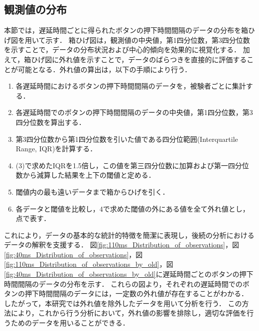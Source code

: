 \subsection{観測値の分布}
本節では，遅延時間ごとに得られたボタンの押下時間間隔のデータの分布を箱ひげ図を用いて示す．
箱ひげ図は，観測値の中央値，第1四分位数，第3四分位数を示すことで，データの分布状況および中心的傾向を効果的に視覚化する．
加えて，箱ひげ図に外れ値を示すことで，データのばらつきを直接的に評価することが可能となる．外れ値の算出は，以下の手順により行う．
\begin{enumerate}
  \item 各遅延時間におけるボタンの押下時間間隔のデータを，被験者ごとに集計する．
  \item 各遅延時間でのボタンの押下時間間隔のデータの中央値，第1四分位数，第3四分位数を算出する．
  \item 第3四分位数から第1四分位数を引いた値である四分位範囲(Interquartile Range, IQR)を計算する．
  \item (3)で求めたIQRを1.5倍し，この値を第三四分位数に加算および第一四分位数から減算した結果を上下の閾値と定める．
  \item 閾値内の最も遠いデータまで箱からひげを引く．
  \item 各データと閾値を比較し，4で求めた閾値の外にある値を全て外れ値とし，点で表す．
\end{enumerate}
これにより，データの基本的な統計的特徴を簡潔に表現し，後続の分析におけるデータの解釈を支援する．
図\ref{fig:110ms_Distribution_of_observations}，図\ref{fig:40ms_Distribution_of_observations}，図\ref{fig:110ms_Distribution_of_observations_by_old}，図\ref{fig:40ms_Distribution_of_observations_by_old}に遅延時間ごとのボタンの押下時間間隔のデータの分布を示す．
これらの図より，それぞれの遅延時間でのボタンの押下時間間隔のデータには，一定数の外れ値が存在することがわかる．
したがって，本研究では外れ値を除外したデータを用いて分析を行う．
この方法により，これから行う分析において，外れ値の影響を排除し，適切な評価を行うためのデータを用いることができる．

